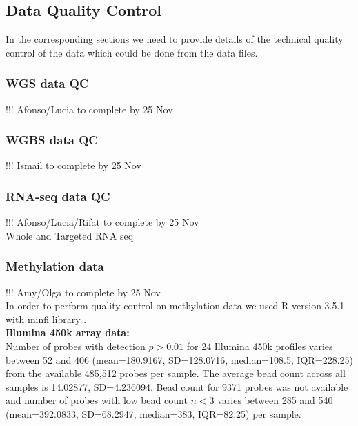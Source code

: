 \documentclass[english]{article}
\begin{document}
\subsection*{Data Quality Control}
{\color{Red} In the corresponding sections we need to provide details of the technical quality control of the data which could be done from the data files.}

\subsubsection*{WGS data QC}
\colorbox{BurntOrange}{!!! Afonso/Lucia to complete by 25 Nov}\\


\subsubsection*{WGBS data QC}
\colorbox{BurntOrange}{!!! Ismail to complete by 25 Nov}\\


\subsubsection*{RNA-seq data QC}
\colorbox{BurntOrange}{!!! Afonso/Lucia/Rifat to complete by 25 Nov}\\
Whole and Targeted RNA seq

\subsubsection*{Methylation data}
\colorbox{BurntOrange}{!!! Amy/Olga to complete by 25 Nov}\\
In order to perform quality control on methylation data we used R version 3.5.1 with minfi library \cite{minfi}.\\
\textbf{Illumina 450k array data:}\\
Number of probes with detection $p>0.01$ for 24 Illumina 450k profiles varies between 52 and 406 (mean=180.9167, SD=128.0716, median=108.5, IQR=228.25) from the available 485,512 probes per sample.
The average bead count across all samples is 14.02877, SD=4.236094. Bead count for 9371 probes was not available and number of probes with low bead count $n<3$ varies between 285 and 540 (mean=392.0833, SD=68.2947, median=383, IQR=82.25) per sample.
\end{document}
